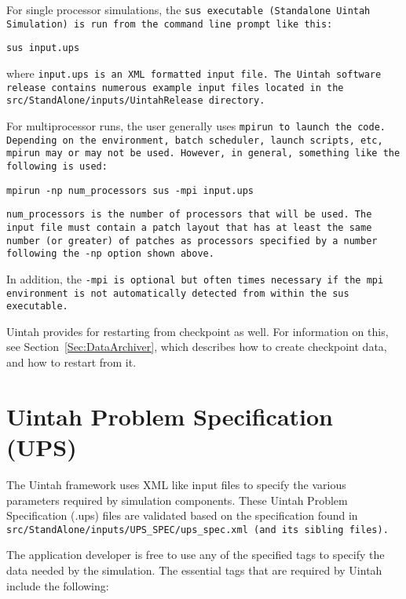 For single processor simulations, the \tt sus \normalfont executable
(Standalone Uintah Simulation) is run from the command line prompt
like this:
\begin{Verbatim}[fontsize=\footnotesize]
  sus input.ups
\end{Verbatim}
where \tt input.ups \normalfont is an XML formatted input file.  The
Uintah software release contains numerous example input files located
in the \tt src/StandAlone/inputs/UintahRelease \normalfont directory.

For multiprocessor runs, the user generally uses \tt mpirun
\normalfont to launch the code.  Depending on the environment, batch
scheduler, launch scripts, etc, \tt mpirun \normalfont may or may not
be used.  However, in general, something like the following is used:
\begin{Verbatim}[fontsize=\footnotesize]
  mpirun -np num_processors sus -mpi input.ups
\end{Verbatim}

\tt num\_processors \normalfont is the number of processors that will
be used.  The input file must contain a patch layout that has at least
the same number (or greater) of patches as processors specified by a
number following the -np option shown above.

In addition, the \tt -mpi \normalfont is optional but often times
necessary if the mpi environment is not automatically detected from
within the sus executable.

Uintah provides for restarting from checkpoint as well.  For information on
this, see Section~\ref{Sec:DataArchiver}, which describes how to create
checkpoint data, and how to restart from it.

\section{Uintah Problem Specification (UPS)} \label{Sec:UPS}

The Uintah framework uses XML like input files to specify the various
parameters required by simulation components.  These Uintah Problem
Specification (.ups) files are validated based on the specification
found in \tt src/StandAlone/inputs/UPS\_SPEC/ups\_spec.xml \normalfont
(and its sibling files).  

The application developer is free to use any of the specified tags to
specify the data needed by the simulation.  The essential tags that
are required by Uintah include the following:

